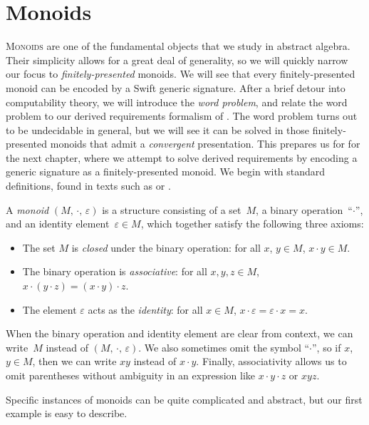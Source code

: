 \documentclass[../generics]{subfiles}
\begin{document}
\chapter{Monoids}\label{monoids}

\lettrine{M}{onoids} are one of the fundamental objects that we study in abstract algebra. Their simplicity allows for a great deal of generality, so we will quickly narrow our focus to \emph{finitely-presented} monoids. We will see that every finitely-presented monoid can be encoded by a Swift generic signature. After a brief detour into computability theory, we will introduce the \emph{word problem}, and relate the word problem to our derived requirements formalism of . The word problem turns out to be undecidable in general, but we will see it can be solved in those finitely-presented monoids that admit a \emph{convergent} presentation. This prepares us for for the next chapter, where we attempt to solve derived requirements by encoding a generic signature as a finitely-presented monoid. We begin with standard definitions, found in texts such as \cite{semigroup} or \cite{postmodern}.
\begin{definition}
A \emph{monoid} \index{$\cdot$}$(M,\, \cdot,\, \varepsilon)$ is a structure consisting of a set~$M$, a binary operation~``\;$\cdot$\;'', and an identity element~$\varepsilon\in M$, which together satisfy the following three axioms:
\begin{itemize}
\item The set $M$ is \emph{closed} under the binary operation: for all $x$, $y \in M$, $x\cdot y\in M$.
\item The binary operation is \emph{associative}: for all $x, y, z \in M$, $x\cdot(y\cdot z)=(x\cdot y)\cdot z$.
\item The element $\varepsilon$ acts as the \emph{identity}: for all $x\in M$, $x\cdot \varepsilon=\varepsilon\cdot x=x$.
\end{itemize}
When the binary operation and identity element are clear from context, we can write~$M$ instead of $(M,\,\cdot,\,\varepsilon)$. We also sometimes omit the symbol ``\;$\cdot$\;'', so if $x$, $y\in M$, then we can write $xy$ instead of $x\cdot y$. Finally, associativity allows us to omit parentheses without ambiguity in an expression like $x\cdot y\cdot z$ or $xyz$.

Specific instances of monoids can be quite complicated and abstract, but our first example is easy to describe.
\end{definition}
\end{document}
